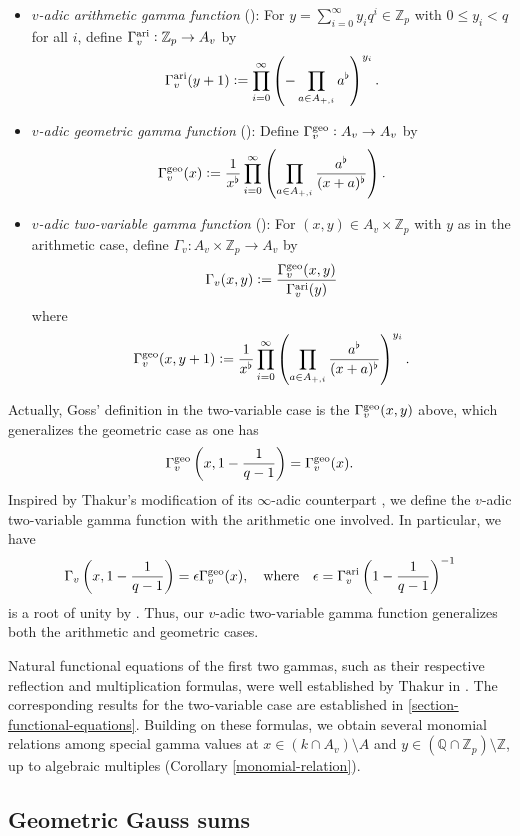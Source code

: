 \documentclass[11pt]{amsart}
\theoremstyle{plain}
\theoremstyle{definition}
\theoremstyle{remark}
\numberwithin{equation}{section}
\newcommand{\ZZ}{\mathbb{Z}}
\newcommand{\QQ}{\mathbb{Q}}
\newcommand{\Ami}{A_{+,i}}
\newcommand{\vag}{\Gamma_v^{\textnormal{ari}}}
\newcommand{\vgg}{\Gamma_v^{\textnormal{geo}}}
\newcommand{\vtg}{\Gamma_v}
\begin{document}
	\begin{itemize}
		\item \textit{$v$-adic arithmetic gamma function} (\cite[Appendix]{goss1980modular}): For $y = \sum_{i=0}^{\infty} y_iq^i \in \ZZ_p$ with $0\leq y_i < q$ for all $i$, define $\vag: \ZZ_p \to A_v$ by
		$$
		\vag (y+1) := \prod_{i=0}^{\infty} \left( -\prod_{a\in \Ami} a^\flat \right)^{y_i}.
		$$
		
		\item \textit{$v$-adic geometric gamma function} (\cite[Section 5]{thakur1991gamma}): Define $\vgg: A_v \to A_v$ by
		$$
		\vgg(x) := \frac{1}{x^\flat} \prod_{i=0}^{\infty} \left( \prod_{a\in \Ami} \frac{a^\flat}{(x+a)^\flat} \right).
		$$
		
		\item \textit{$v$-adic two-variable gamma function} (\cite[Subsection 9.9]{goss1996basic}): For $(x,y) \in A_v \times \ZZ_p$ with $y$ as in the arithmetic case, define $\vtg: A_v \times \ZZ_p \to A_v$ by
		$$
		\vtg(x,y) := \frac{\vgg(x,y)}{\vag(y)}
		$$
		where
		$$
		\vgg(x,y+1) := \frac{1}{x^\flat} \prod_{i=0}^\infty \left( \prod_{a\in\Ami} \frac{a^\flat}{(x+a)^\flat} \right)^{y_i}.
		$$
	\end{itemize}
	Actually, Goss' definition in the two-variable case is the $\vgg(x,y)$ above, which generalizes the geometric case as one has
	$$
	\vgg\left(x , 1-\frac{1}{q-1}\right)
	= \vgg(x).
	$$
	Inspired by Thakur's modification of its $\infty$-adic counterpart \cite[Section 8]{thakur1991gamma}, we define the $v$-adic two-variable gamma function with the arithmetic one involved.
	In particular, we have
	$$
	\vtg\left(x , 1-\frac{1}{q-1}\right) 
	= \epsilon \vgg(x),
	\quad
	\text{where}
	\quad
	\epsilon = \vag\left(1-\frac{1}{q-1}\right)^{-1}
	$$
	is a root of unity by \cite[Theorem 4.4]{thakur1991gamma}.
	Thus, our $v$-adic two-variable gamma function generalizes both the arithmetic and geometric cases.
	
	Natural functional equations of the first two gammas, such as their respective reflection and multiplication formulas, were well established by Thakur in \cite{thakur1991gamma}.
	The corresponding results for the two-variable case are established in \ref{section-functional-equations}.
	Building on these formulas, we obtain several monomial relations among special gamma values at $x\in (k \cap A_v) \setminus A$ and $y\in (\QQ \cap \ZZ_p) \setminus \ZZ$, up to algebraic multiples (Corollary \ref{monomial-relation}).
	
	\subsection{Geometric Gauss sums}
	
\end{document}

